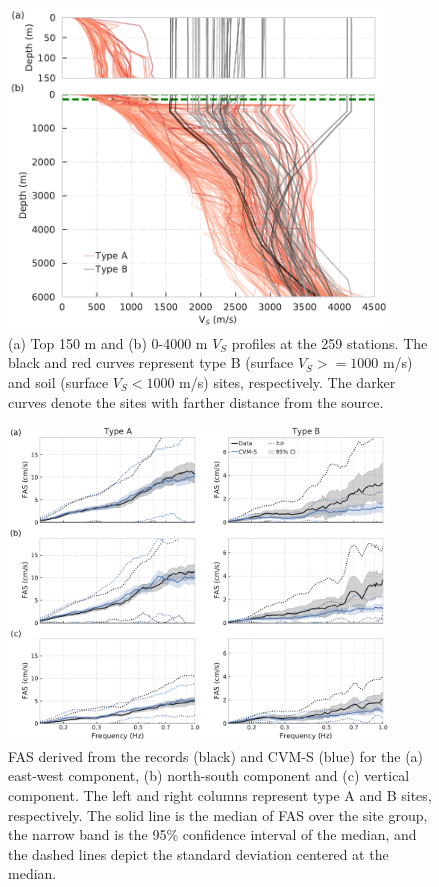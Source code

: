\clearpage
\begin{figure}[!ht]
  \centering
  \includegraphics[width=0.9\textwidth]{figures/figure_vs30_3.pdf}
  \caption{(a) Top 150 m and (b) 0-4000 m $V_S$ profiles at the 259 stations. The black and red curves represent type B (surface $V_S >= 1000$ m/s) and soil (surface $V_S < 1000$ m/s) sites, respectively. The darker curves denote the sites with farther distance from the source.}
  \label{fig:vs30-3}
\end{figure}

\clearpage
\begin{figure}[!ht]
  \centering
  \includegraphics[width=0.9\textwidth]{figures/figure_vs30_4.pdf}
  \caption{FAS derived from the records (black) and CVM-S (blue) for the (a) east-west component, (b) north-south component and (c) vertical component. The left and right columns represent type A and B sites, respectively. The solid line is the median of FAS over the site group, the narrow band is the 95\% confidence interval of the median, and the dashed lines depict the standard deviation centered at the median.
  }
  \label{fig:vs30-4}
\end{figure}


